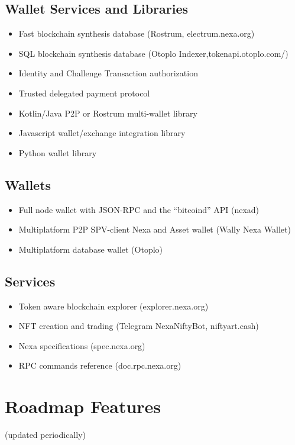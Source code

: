 \documentclass[a4paper, 11pt]{article}
\begin{document}
\subsection{Wallet Services and Libraries}
\begin{itemize}
    \item Fast blockchain synthesis database (Rostrum, electrum.nexa.org)
    \item SQL blockchain synthesis database (Otoplo Indexer,tokenapi.otoplo.com/)
    \item Identity and Challenge Transaction authorization
    \item Trusted delegated payment protocol
    \item Kotlin/Java P2P or Rostrum multi-wallet library
    \item Javascript wallet/exchange integration library
    \item Python wallet library
\end{itemize}

\subsection{Wallets}
\begin{itemize}
    \item Full node wallet with JSON-RPC and the “bitcoind” API (nexad)
    \item Multiplatform P2P SPV-client Nexa and Asset wallet (Wally Nexa Wallet)
    \item Multiplatform database wallet (Otoplo)
\end{itemize}

\subsection{Services}
\begin{itemize}
    \item Token aware blockchain explorer (explorer.nexa.org)
    \item NFT creation and trading (Telegram NexaNiftyBot, niftyart.cash)
    \item Nexa specifications (spec.nexa.org)
    \item RPC commands reference (doc.rpc.nexa.org)
\end{itemize}

\section{Roadmap Features}
(updated periodically)
\end{document}
